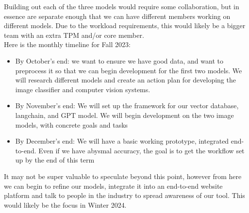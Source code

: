 \documentclass[runningheads]{llncs}
\begin{document}
\noindent Building out each of the three models would require some collaboration, but in essence are separate enough that we can have different members working on different models. Due to the workload requirements, this would likely be a bigger team with an extra TPM and/or core member. \\


\noindent Here is the monthly timeline for Fall 2023:\\
\begin{itemize} 
    \item By October's end: we want to ensure we have good data, and want to preprocess it so that we can begin development for the first two models. We will research different models and create an action plan for developing the image classifier and computer vision systems. \\
    \item By November's end: We will set up the framework for our vector database, langchain, and GPT model. We will begin development on the two image models, with concrete goals and tasks\\
    \item By December's end: We will have a basic working prototype, integrated end-to-end. Even if we have abysmal accuracy, the goal is to get the workflow set up by the end of this term\\
\end{itemize}

\noindent It may not be super valuable to speculate beyond this point, however from here we can begin to refine our models, integrate it into an end-to-end website platform and talk to people in the industry to spread awareness of our tool. This would likely be the focus in Winter 2024.


%
%
% 
% 
%
\end{document}
